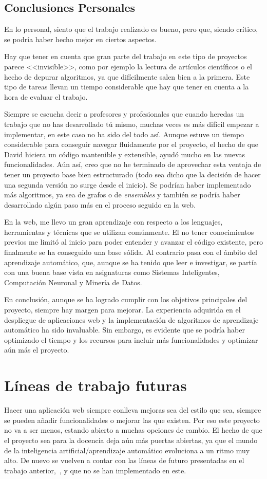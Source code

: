\subsection{Conclusiones Personales}
En lo personal, siento que el trabajo realizado es bueno, pero que, siendo crítico, se podría haber hecho mejor en ciertos aspectos.

Hay que tener en cuenta que gran parte del trabajo en este tipo de proyectos parece <<invisible>>, como por ejemplo la lectura de artículos científicos o el hecho de depurar algoritmos, ya que difícilmente salen bien a la primera. Este tipo de tareas llevan un tiempo considerable que hay que tener en cuenta a la hora de evaluar el trabajo.

Siempre se escucha decir a profesores y profesionales que cuando heredas un trabajo que no has desarrollado tú mismo, muchas veces es más difícil empezar a implementar, en este caso no ha sido del todo así. Aunque estuve un tiempo considerable para conseguir navegar fluidamente por el proyecto, el hecho de que David hiciera un código mantenible y extensible, ayudó mucho en las nuevas funcionalidades. Aún así, creo que no he terminado de aprovechar esta ventaja de tener un proyecto base bien estructurado (todo sea dicho que la decisión de hacer una segunda versión no surge desde el inicio). Se podrían haber implementado más algoritmos, ya sea de grafos o de \textit{ensembles} y también se podría haber desarrollado algún paso más en el proceso seguido en la web.

En la web, me llevo un gran aprendizaje con respecto a los lenguajes, herramientas y técnicas que se utilizan comúnmente. El no tener conocimientos previos me limitó al inicio para poder entender y avanzar el código existente, pero finalmente se ha conseguido una base sólida. Al contrario pasa con el ámbito del aprendizaje automático, que, aunque se ha tenido que leer e investigar, se partía con una buena base vista en asignaturas como Sistemas Inteligentes, Computación Neuronal y Minería de Datos.

En conclusión, aunque se ha logrado cumplir con los objetivos principales del proyecto, siempre hay margen para mejorar. La experiencia adquirida en el despliegue de aplicaciones web y la implementación de algoritmos de aprendizaje automático ha sido invaluable. Sin embargo, es evidente que se podría haber optimizado el tiempo y los recursos para incluir más funcionalidades y optimizar aún más el proyecto.

\section{Líneas de trabajo futuras}
Hacer una aplicación web siempre conlleva mejoras sea del estilo que sea, siempre se pueden añadir funcionalidades o mejorar las que existen. Por eso este proyecto no va a ser menos, estando abierto a muchas opciones de cambio. El hecho de que el proyecto sea para la docencia deja aún más puertas abiertas, ya que el mundo de la inteligencia artificial/aprendizaje automático evoluciona a un ritmo muy alto. De nuevo se vuelven a contar con las líneas de futuro presentadas en el trabajo anterior,~\cite{TFG:David}, y que no se han implementado en este.

